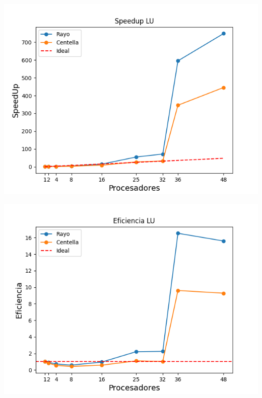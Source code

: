 \begin{center}
 \centering
 \begin{minipage}[b]{.49\textwidth}
  \includegraphics[width=1\linewidth]{plots/speed-up-lu.png}
 \end{minipage}
 \begin{minipage}[b]{.49\textwidth}
  \includegraphics[width=1\linewidth]{plots/efficiency-lu.png}
 \end{minipage}
\end{center}

